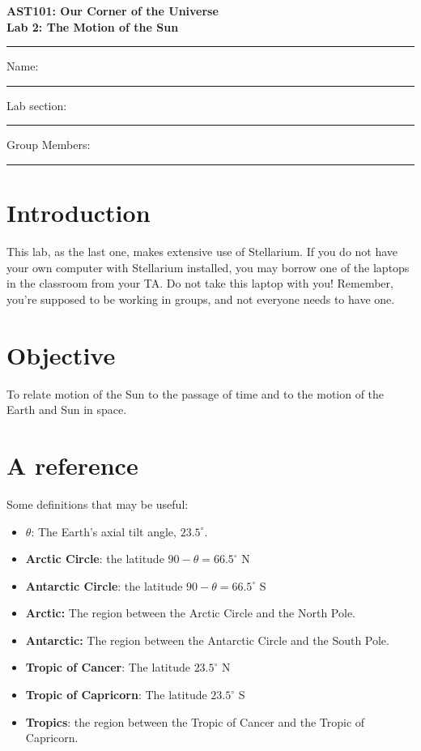 \documentclass[11pt]{article}
\begin{document}
\begin{center}
\textbf{\Large
AST101: Our Corner of the Universe \\
\vspace*{0.1cm}
Lab 2: The Motion of the Sun
}
\end{center}

\vspace*{0.5cm}

\hrule
{\Large Name:}\vspace*{0.5cm}\\\hrule
{\Large Lab section:}\vspace*{0.5cm}\\\hrule
{\Large Group Members:}\vspace*{0.5cm}\\\hrule
\vspace*{0.5cm}

\section{Introduction}

This lab, as the last one, makes extensive use of Stellarium. 
If you do not have your own computer with Stellarium installed, you may borrow one of the laptops in the classroom from your TA. Do not take this laptop with you! Remember, you're supposed to be working in groups, and not everyone needs to have one.

\section*{Objective}

To relate motion of the Sun to the passage of time and to the motion of the Earth and Sun in space.

\section{A reference}


Some definitions that may be useful:

\begin{itemize}
\item {\bf $\theta$}: The Earth's axial tilt angle, $23.5^\circ$.
\item {\bf Arctic Circle}: the latitude $90-\theta = 66.5^\circ$ N
\item {\bf Antarctic Circle}: the latitude $90-\theta = 66.5^\circ$ S
\item {\bf Arctic:} The region between the Arctic Circle and the North Pole.
\item {\bf Antarctic:} The region between the Antarctic Circle and the South Pole.
\item {\bf Tropic of Cancer}: The latitude $23.5^\circ$ N
\item {\bf Tropic of Capricorn}: The latitude $23.5^\circ$ S
\item {\bf Tropics}: the region between the Tropic of Cancer and the Tropic of Capricorn.
\end{itemize}
\end{document}

